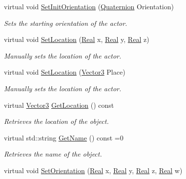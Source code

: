 \begin{DoxyCompactItemize}
virtual void \hyperlink{classphys_1_1ActorBase_a681186465db767954ca3f9530a1d7c36}{SetInitOrientation} (\hyperlink{classphys_1_1Quaternion}{Quaternion} Orientation)
\begin{DoxyCompactList}\small\item\em Sets the starting orientation of the actor. \item\end{DoxyCompactList}\item 
virtual void \hyperlink{classphys_1_1ActorBase_a0b0db2ec0f4926326635b86f1ead2276}{SetLocation} (\hyperlink{namespacephys_af7eb897198d265b8e868f45240230d5f}{Real} x, \hyperlink{namespacephys_af7eb897198d265b8e868f45240230d5f}{Real} y, \hyperlink{namespacephys_af7eb897198d265b8e868f45240230d5f}{Real} z)
\begin{DoxyCompactList}\small\item\em Manually sets the location of the actor. \item\end{DoxyCompactList}\item 
virtual void \hyperlink{classphys_1_1ActorBase_a3212be459859a67bf7ae64919d58d5a5}{SetLocation} (\hyperlink{classphys_1_1Vector3}{Vector3} Place)
\begin{DoxyCompactList}\small\item\em Manually sets the location of the actor. \item\end{DoxyCompactList}\item 
virtual \hyperlink{classphys_1_1Vector3}{Vector3} \hyperlink{classphys_1_1ActorBase_a777b4ea4d6881af76c646b1ba9324d96}{GetLocation} () const 
\begin{DoxyCompactList}\small\item\em Retrieves the location of the object. \item\end{DoxyCompactList}\item 
virtual std::string \hyperlink{classphys_1_1ActorBase_a8309f5bd133c936abe3a856b0240159f}{GetName} () const =0
\begin{DoxyCompactList}\small\item\em Retrieves the name of the object. \item\end{DoxyCompactList}\item 
virtual void \hyperlink{classphys_1_1ActorBase_adbf0cc77031f22597a799fd0f7f8216d}{SetOrientation} (\hyperlink{namespacephys_af7eb897198d265b8e868f45240230d5f}{Real} x, \hyperlink{namespacephys_af7eb897198d265b8e868f45240230d5f}{Real} y, \hyperlink{namespacephys_af7eb897198d265b8e868f45240230d5f}{Real} z, \hyperlink{namespacephys_af7eb897198d265b8e868f45240230d5f}{Real} w)

\end{DoxyCompactItemize}
